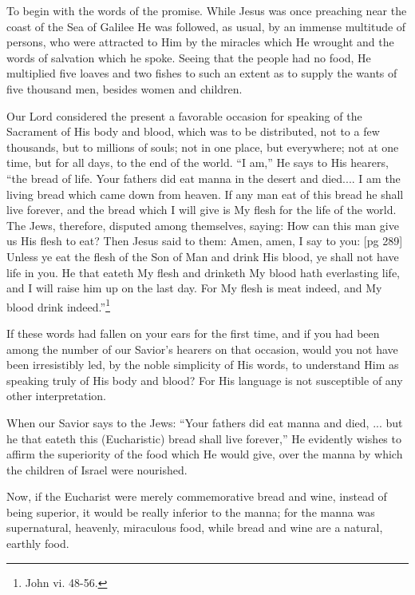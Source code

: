 To begin with the words of the promise. While
Jesus was once preaching near the coast of the
Sea of Galilee He was followed, as usual, by an
immense multitude of persons, who were attracted
to Him by the miracles which He wrought and the
words of salvation which he spoke. Seeing that
the people had no food, He multiplied five loaves
and two fishes to such an extent as to supply the
wants of five thousand men, besides women and
children.

Our Lord considered the present a favorable
occasion for speaking of the Sacrament of His
body and blood, which was to be distributed, not
to a few thousands, but to millions of souls; not
in one place, but everywhere; not at one time, but
for all days, to the end of the world. “I am,” He
says to His hearers, “the bread of life. Your
fathers did eat manna in the desert and died....
I am the living bread which came down
from heaven. If any man eat of this bread he
shall live forever, and the bread which I will give
is My flesh for the life of the world. The Jews,
therefore, disputed among themselves, saying:
How can this man give us His flesh to eat? Then
Jesus said to them: Amen, amen, I say to you:
[pg 289]
Unless ye eat the flesh of the Son of Man and
drink His blood, ye shall not have life in you. He
that eateth My flesh and drinketh My blood hath
everlasting life, and I will raise him up on the last
day. For My flesh is meat indeed, and My blood
drink indeed.”\footnote{John vi. 48-56.}

If these words had fallen on your ears for the
first time, and if you had been among the number
of our Savior's hearers on that occasion, would
you not have been irresistibly led, by the noble simplicity
of His words, to understand Him as speaking
truly of His body and blood? For His language
is not susceptible of any other interpretation.

When our Savior says to the Jews: “Your
fathers did eat manna and died, ... but he that
eateth this (Eucharistic) bread shall live forever,”
He evidently wishes to affirm the superiority
of the food which He would give, over the
manna by which the children of Israel were
nourished.

Now, if the Eucharist were merely commemorative
bread and wine, instead of being superior, it
would be really inferior to the manna; for the
manna was supernatural, heavenly, miraculous
food, while bread and wine are a natural, earthly
food.

